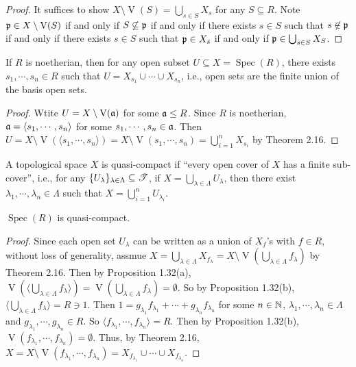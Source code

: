 \begin{proof}
    It suffices to show $X \setminus \operatorname{V}(S) = \bigcup_{s \in S}X_s$ for any $S \subseteq R$. Note $\mathfrak{p} \in X \setminus \operatorname{V}(S)$ if and only if $S \not \subseteq \mathfrak{p}$ if and only if there exists $s \in S$ such that $s \not \in \mathfrak{p}$ if and only if there exists $s \in S$ such that $\mathfrak{p} \in X_s$ if and only if $\mathfrak{p} \in \bigcup_{s \in S}X_S$.
\end{proof}

\begin{proposition}
    If $R$ is noetherian, then for any open subset $U \subseteq X = \operatorname{Spec}(R)$, there exists $s_1,\cdots,s_n \in R$ such that $U = X_{s_1} \cup \cdots \cup X_{s_n}$, i.e., open sets are the finite union of the basis open sets.
\end{proposition}

\begin{proof}
    Wtite $U = X \setminus \operatorname{V}(\mathfrak{a})$ for some $\mathfrak{a} \leq R$. Since $R$ is noetherian, $\mathfrak{a} = \langle s_1,\cdots,s_n \rangle$ for some $s_1,\cdots,s_n \in \mathfrak{a}$. Then $U = X \setminus \operatorname{V}(\langle s_1,\cdots,s_n \rangle) = X \setminus \operatorname{V}(s_1,\cdots,s_n) = \bigcup_{i=1}^n X_{s_i}$ by Theorem 2.16.
\end{proof}

\begin{definition}
    A topological space $X$ is quasi-compact if ``every open cover of $X$ has a finite sub-cover'', i.e., for any $\{U_\lambda\}_{\lambda \in \Lambda} \subseteq \mathscr{T}$, if $X = \bigcup_{\lambda \in \Lambda} U_\lambda$, then there exist $\lambda_1,\cdots,\lambda_n \in \Lambda$ such that $X = \bigcup_{i=1}^n U_{\lambda_i}$.
\end{definition}

\begin{theorem}
    $\operatorname{Spec}(R)$ is quasi-compact.
\end{theorem}

\begin{proof}
    Since each open set $U_\lambda$ can be written as a union of $X_f$'s with $f \in R$, without loss of generality, assmue $X = \bigcup_{\lambda \in \Lambda} X_{f_\lambda} = X \setminus \operatorname{V}(\bigcup_{\lambda \in \Lambda}f_{\lambda})$ by Theorem 2.16. Then by Proposition 1.32(a), $\operatorname{V}(\langle \bigcup_{\lambda \in \Lambda}f_{\lambda} \rangle) = \operatorname{V}(\bigcup_{\lambda \in \Lambda}f_{\lambda}) = \emptyset$. So by Proposition 1.32(b), $\langle \bigcup_{\lambda \in \Lambda}f_{\lambda} \rangle = R \ni 1$. Then $1 = g_{\lambda_1} f_{\lambda_1} + \cdots + g_{\lambda_n}f_{\lambda_n}$ for some $n \in \mathbb{N}$, $\lambda_1,\cdots,\lambda_n \in \Lambda$ and $g_{\lambda_1},\cdots,g_{\lambda_n} \in R$. So $\langle f_{\lambda_1},\cdots,f_{\lambda_n} \rangle = R$. Then by Proposition 1.32(b), $\operatorname{V}(f_{\lambda_1},\cdots,f_{\lambda_n}) = \emptyset$. Thus, by Theorem 2.16, $X = X \setminus \operatorname{V}(f_{\lambda_1},\cdots,f_{\lambda_n}) = X_{f_{\lambda_1}} \cup \cdots \cup X_{f_{\lambda_n}}$.
\end{proof}

